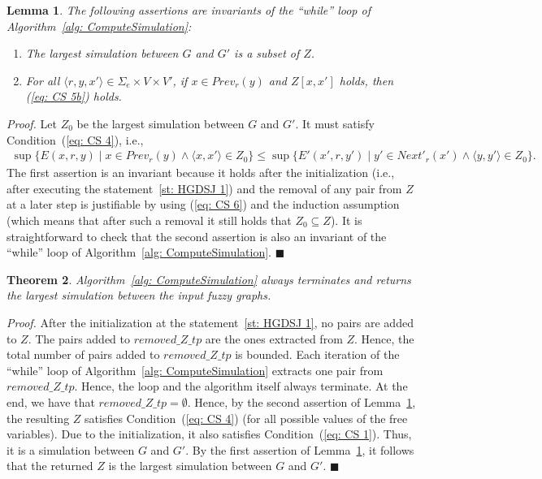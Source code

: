 \documentclass[11pt]{article}
\def\tuple#1{\langle#1\rangle}
\def\eqref#1{(\ref{#1})}
\newcommand{\myend}{\mbox{}\hfill{\footnotesize$\blacksquare$}}
\newcommand{\SE}{\Sigma_e}
\newcommand{\Prev}{\mathit{Prev}}
\newcommand{\NextP}{\mathit{Next}'}
\newcommand{\removeZ}{\textit{removed\_Z\_tp}}
\newtheorem{theorem}{Theorem}[section]
\newtheorem{lemma}[theorem]{Lemma}
\newenvironment{proof}{
	
	\smallskip
	
	\noindent
	{\em Proof.}}{
	
	\smallskip
	
}
\begin{document}
\begin{lemma}\label{lemma: JHDKA}
The following assertions are invariants of the ``while'' loop of Algorithm~\ref{alg: ComputeSimulation}: 
\begin{enumerate}
\item The largest simulation between $G$ and $G'$ is a subset of $Z$.
\item For all $\tuple{r,y,x'} \in \SE \times V \times V'$, if $x \in \Prev_r(y)$ and $Z[x,x']$ holds, then \eqref{eq: CS 5b} holds.
\end{enumerate}
\end{lemma}

\begin{proof}
Let $Z_0$ be the largest simulation between $G$ and $G'$. It must satisfy Condition~\eqref{eq: CS 4}, i.e., 
\begin{eqnarray}
\sup \{E(x,r,y) \mid x \in \Prev_r(y) \land \tuple{x,x'} \in Z_0\} \leq 
   \sup \{E'(x',r,y') \mid y' \in \NextP_r(x') \land \tuple{y,y'} \in Z_0\}. \label{eq: CS 6}
\end{eqnarray}
The first assertion is an invariant because it holds after the initialization (i.e., after executing the statement~\ref{st: HGDSJ 1}) and the removal of any pair from $Z$ at a later step is justifiable by using \eqref{eq: CS 6} and the induction assumption (which means that after such a removal it still holds that $Z_0 \subseteq Z$). 
%
It is straightforward to check that the second assertion is also an invariant of the ``while'' loop of Algorithm~\ref{alg: ComputeSimulation}. 
\myend
\end{proof}

\begin{theorem}\label{theorem: HDKAL}
Algorithm~\ref{alg: ComputeSimulation} always terminates and returns the largest simulation between the input fuzzy graphs.
\end{theorem}

\begin{proof}
After the initialization at the statement~\ref{st: HGDSJ 1}, no pairs are added to $Z$. The pairs added to $\removeZ$ are the ones extracted from $Z$. Hence, the total number of pairs added to $\removeZ$ is bounded. Each iteration of the ``while'' loop of Algorithm~\ref{alg: ComputeSimulation} extracts one pair from $\removeZ$. Hence, the loop and the algorithm itself always terminate. At the end, we have that $\removeZ = \emptyset$. Hence, by the second assertion of Lemma~\ref{lemma: JHDKA}, the resulting $Z$ satisfies Condition~\eqref{eq: CS 4} (for all possible values of the free variables). Due to the initialization, it also satisfies Condition~\eqref{eq: CS 1}. Thus, it is a simulation between $G$ and $G'$. By the first assertion of Lemma~\ref{lemma: JHDKA}, it follows that the returned $Z$ is the largest simulation between $G$ and $G'$.
\myend
\end{proof}
\end{document}
